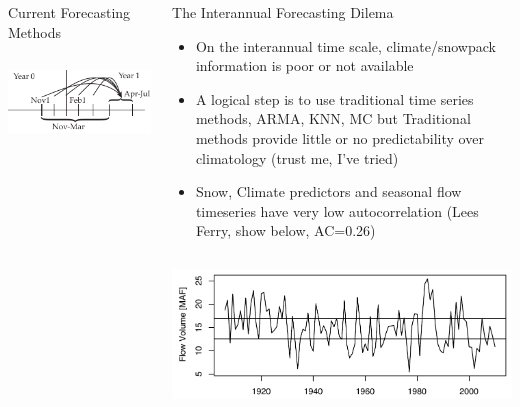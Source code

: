 \documentclass[final,x11names]{beamer}
\begin{document}
\begin{frame}{}
\begin{columns}
\begin{column}{.33\linewidth}
\begin{block}{\large Current Forecasting Methods}
\begin{columns} [T]
\begin{column}{.45\textwidth}
			  \end{column} 
			\end{columns}
			\centering
			\includegraphics[width=.6\textwidth]{figs/one-year.pdf} 
		\end{block}
      \end{column}
        
        \begin{column}{.33\linewidth}
        \begin{block}{\large The Interannual Forecasting Dilema}
        
			\begin{itemize}
				\item On the interannual time scale, {\color{orange}climate/snowpack information 
				      is poor} or not available
				\item A logical step is to use traditional time series methods, ARMA, KNN, MC 
				      but {\color{orange}Traditional methods provide little or no 
				      predictability over climatology} (trust me, I've tried)
				\item Snow, Climate {\color{orange}predictors and seasonal flow timeseries have 
				      very low autocorrelation} (Lees Ferry, show below, AC=0.26)
							
			\end{itemize}
			
			\begin{columns}
				\begin{column}{.48\textwidth}
					\includegraphics[width=\textwidth]{figs/lees.pdf} 
				

\end{column}
\end{columns}
\end{block}
\end{column}
\end{columns}
\end{frame}
\end{document}
